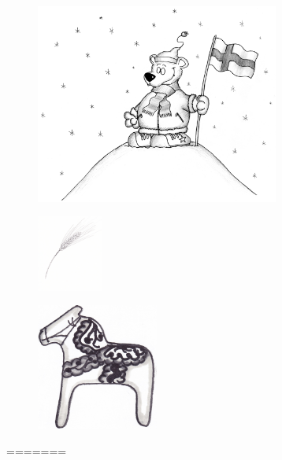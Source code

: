 %

\begin{figure}[!b]
\begin{center}
\includegraphics[width=8cm]{../bilder/i_hogan_nord.png} 
\end{center}
\end{figure}
\clearpage

\clearpage

\clearpage

\clearpage

\clearpage

\begin{figure}[!b]
\begin{center}
\includegraphics[height=25mm]{../bilder/sad.jpg} 
\end{center}
\end{figure}
\clearpage

\clearpage

\clearpage

\clearpage

\clearpage

\clearpage

\clearpage

\clearpage

\clearpage

\begin{figure}[!b]
\begin{center}
\includegraphics[width=4cm]{../bilder/dalahast.jpg} 
\end{center}
\end{figure}
\clearpage

\clearpage

=======
\clearpage
